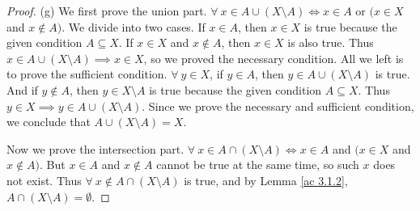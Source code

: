 \begin{proof}{(g)}
We first prove the union part.
\(\forall\ x \in A \cup (X \setminus A) \iff x \in A\) or \((x \in X\) and \(x \notin A)\).
We divide into two cases.
If \(x \in A\), then \(x \in X\) is true because the given condition \(A \subseteq X\).
If \(x \in X\) and \(x \notin A\), then \(x \in X\) is also true.
Thus \(x \in A \cup (X \setminus A) \implies x \in X\), so we proved the necessary condition.
All we left is to prove the sufficient condition.
\(\forall\ y \in X\), if \(y \in A\), then \(y \in A \cup (X \setminus A)\) is true.
And if \(y \notin A\), then \(y \in X \setminus A\) is true because the given condition \(A \subseteq X\).
Thus \(y \in X \implies y \in A \cup (X \setminus A)\).
Since we prove the necessary and sufficient condition, we conclude that \(A \cup (X \setminus A) = X\).

Now we prove the intersection part.
\(\forall\ x \in A \cap (X \setminus A) \iff x \in A\) and \((x \in X\) and \(x \notin A)\).
But \(x \in A\) and \(x \notin A\) cannot be true at the same time, so such \(x\) does not exist.
Thus \(\forall\ x \notin A \cap (X \setminus A)\) is true, and by Lemma \ref{ac 3.1.2}, \(A \cap (X \setminus A) = \emptyset\).
\end{proof}


